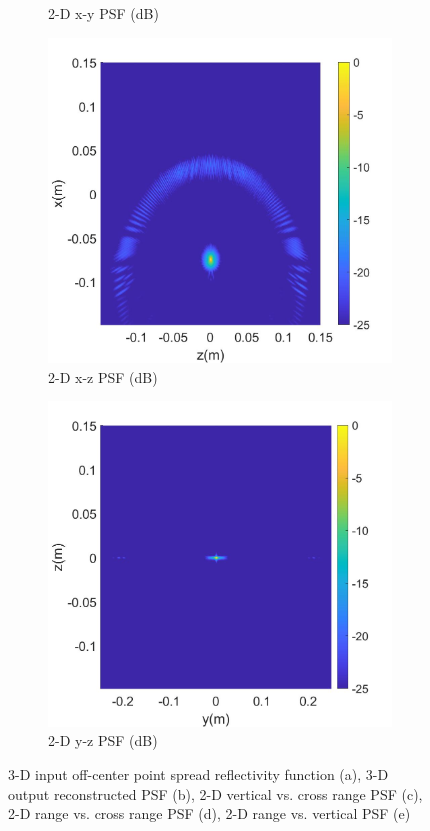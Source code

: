 \documentclass[conference]{IEEEtran}
\begin{document}
\begin{figure} [h]
\begin{subfigure}{.5\linewidth}
				\caption{2-D x-y PSF (dB)}
			\end{subfigure}%
			\begin{subfigure}{.5\linewidth}
				\label{fig:psf_xz}
				\centering
				\includegraphics[width=1\linewidth]{../MatlabResults/CSAR_PSFxz}
				\caption{2-D x-z PSF (dB)}
			\end{subfigure}
			\begin{subfigure}{.5\linewidth}
				\label{fig:psf_yz}
				\centering
				\includegraphics[width=1\linewidth]{../MatlabResults/CSAR_PSFyz}
				\caption{2-D y-z PSF (dB)}
			\end{subfigure}
			\caption{3-D input off-center point spread reflectivity function (a), 3-D output reconstructed PSF (b), 2-D vertical vs. cross range PSF (c), 2-D range vs. cross range PSF (d), 2-D range vs. vertical PSF (e)}
			\label{fig:psf}
		\end{figure}
	
\end{document}
